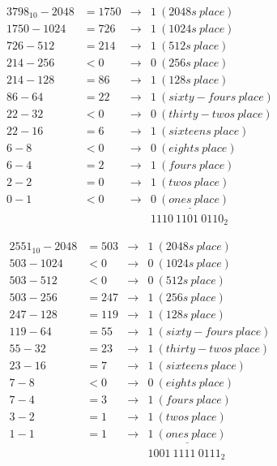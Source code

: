\documentclass{article}
\begin{document}
\begin{align*}
3798_{10} - 2048    &= 1750 &\rightarrow& 1\ (2048s\ place) \\
1750 - 1024         &= 726  &\rightarrow& 1\ (1024s\ place) \\
726 - 512           &= 214  &\rightarrow& 1\ (512s\ place) \\
214 - 256           &< 0    &\rightarrow& 0\ (256s\ place) \\
214 - 128           &= 86   &\rightarrow& 1\ (128s\ place) \\
86 - 64             &= 22   &\rightarrow& 1\ (sixty-fours\ place) \\
22 - 32             &< 0    &\rightarrow& 0\ (thirty-twos\ place) \\
22 - 16             &= 6    &\rightarrow& 1\ (sixteens\ place) \\
6 - 8               &< 0    &\rightarrow& 0\ (eights\ place) \\
6 - 4               &= 2    &\rightarrow& 1\ (fours\ place) \\
2 - 2               &= 0    &\rightarrow& 1\ (twos\ place) \\
0 - 1               &< 0    &\rightarrow& \underline{0\ (ones\ place)} \\
                    &       &           & 1110\ 1101\ 0110_2
\end{align*}

\begin{align*}
2551_{10} - 2048    &= 503  &\rightarrow& 1\ (2048s\ place) \\
503 - 1024          &< 0    &\rightarrow& 0\ (1024s\ place) \\
503 - 512           &< 0    &\rightarrow& 0\ (512s\ place) \\
503 - 256           &= 247  &\rightarrow& 1\ (256s\ place) \\
247 - 128           &= 119  &\rightarrow& 1\ (128s\ place) \\
119 - 64            &= 55   &\rightarrow& 1\ (sixty-fours\ place) \\
55 - 32             &= 23   &\rightarrow& 1\ (thirty-twos\ place) \\
23 - 16             &= 7    &\rightarrow& 1\ (sixteens\ place) \\
7 - 8               &< 0    &\rightarrow& 0\ (eights\ place) \\
7 - 4               &= 3    &\rightarrow& 1\ (fours\ place) \\
3 - 2               &= 1    &\rightarrow& 1\ (twos\ place) \\
1 - 1               &= 1    &\rightarrow& \underline{1\ (ones\ place)} \\
                    &       &           & 1001\ 1111\ 0111_2
\end{align*}
\end{document}
